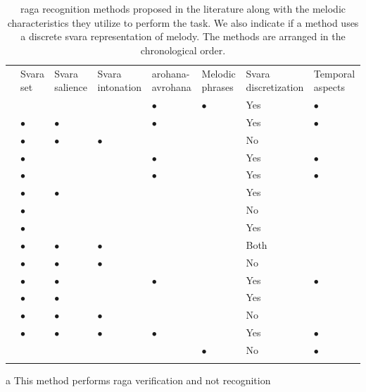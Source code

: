 {\begin{table}
	\begin{threeparttable} 
		\setlength{\tabcolsep}{2pt}
		\small
		\begin{centering}
			\begin{tabular}{l L{2.5cm} L{2cm} L{2.5cm} L{2.5cm} L{2.5cm} L{2.5cm} L{2.5cm}}
				\tabletop
				& Svara set & Svara salience & Svara intonation & \Gls{arohana}-\gls{avrohana} & Melodic phrases & Svara discretization & Temporal aspects\tabularnewline
				\tablemid
				\cite{pandey2003tansen} &  &  &  & $\bullet$ & $\bullet$ & Yes & $\bullet$\tabularnewline
				\cite{chordia2007raag} & $\bullet$ & $\bullet$ &  & $\bullet$ &  & Yes & $\bullet$\tabularnewline
				\cite{belle2009raga} & $\bullet$ & $\bullet$ & $\bullet$ &  &  & No & \tabularnewline
				\cite{Shetty2009} & $\bullet$ &  &  & $\bullet$ &  & Yes & $\bullet$\tabularnewline
				\cite{sridhar2009raga} & $\bullet$ &  &  & $\bullet$ &  & Yes & $\bullet$\tabularnewline
				\cite{koduri2011survey} & $\bullet$ & $\bullet$ &  &  &  & Yes & \tabularnewline
				\cite{ranjani2011carnatic} & $\bullet$ &  &  &  &  & No & \tabularnewline
				\cite{chakraborty2012object} & $\bullet$ &  &  &  &  & Yes & \tabularnewline
				\cite{koduri2012raga} & $\bullet$ & $\bullet$ & $\bullet$ &  &  & Both & \tabularnewline
				\cite{chordia2013joint} & $\bullet$ & $\bullet$ & $\bullet$ &  &  & No & \tabularnewline
				\cite{dighe2013scale} & $\bullet$ & $\bullet$ &  & $\bullet$ &  & Yes & $\bullet$\tabularnewline
				\cite{dighe2013swara} & $\bullet$ & $\bullet$ &  &  &  & Yes & \tabularnewline
				\cite{koduri2014intonation} & $\bullet$ & $\bullet$ & $\bullet$ &  &  & No & \tabularnewline
				\cite{kumar2014identifying} & $\bullet$ & $\bullet$ & $\bullet$ & $\bullet$ &  & Yes & $\bullet$\tabularnewline
				\cite{shrey_ISMIR_2015} &  &  &  &  & $\bullet$ & No & $\bullet$\tabularnewline	
				\tablebot
			\end{tabular}
			\par \end{centering}
		
		\begin{tablenotes}
			\item[a] This method performs \gls{raga} verification and not recognition
		\end{tablenotes}
		\caption{\Gls{raga} recognition methods proposed in the literature along with the melodic characteristics they utilize to perform the task. We also indicate if a method uses a discrete \gls{svara} representation of melody. The methods are arranged in the chronological order. }
		\label{tab:raga_recognition_methods_melodic_characteristics}
	\end{threeparttable}
\end{table}


}
